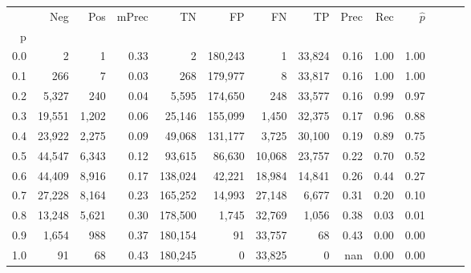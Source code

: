 \begin{tabular}{rrrrrrrrrrrrrr}
\toprule
{} &     Neg &    Pos & mPrec &       TN &       FP &      FN &      TP &  Prec &   Rec & $\hat{p}$ \\
p   &         &        &       &          &          &         &         &       &       &           \\
\midrule
0.0 &       2 &      1 &  0.33 &        2 &  180,243 &       1 &  33,824 &  0.16 &  1.00 &      1.00 \\
0.1 &     266 &      7 &  0.03 &      268 &  179,977 &       8 &  33,817 &  0.16 &  1.00 &      1.00 \\
0.2 &   5,327 &    240 &  0.04 &    5,595 &  174,650 &     248 &  33,577 &  0.16 &  0.99 &      0.97 \\
0.3 &  19,551 &  1,202 &  0.06 &   25,146 &  155,099 &   1,450 &  32,375 &  0.17 &  0.96 &      0.88 \\
0.4 &  23,922 &  2,275 &  0.09 &   49,068 &  131,177 &   3,725 &  30,100 &  0.19 &  0.89 &      0.75 \\
0.5 &  44,547 &  6,343 &  0.12 &   93,615 &   86,630 &  10,068 &  23,757 &  0.22 &  0.70 &      0.52 \\
0.6 &  44,409 &  8,916 &  0.17 &  138,024 &   42,221 &  18,984 &  14,841 &  0.26 &  0.44 &      0.27 \\
0.7 &  27,228 &  8,164 &  0.23 &  165,252 &   14,993 &  27,148 &   6,677 &  0.31 &  0.20 &      0.10 \\
0.8 &  13,248 &  5,621 &  0.30 &  178,500 &    1,745 &  32,769 &   1,056 &  0.38 &  0.03 &      0.01 \\
0.9 &   1,654 &    988 &  0.37 &  180,154 &       91 &  33,757 &      68 &  0.43 &  0.00 &      0.00 \\
1.0 &      91 &     68 &  0.43 &  180,245 &        0 &  33,825 &       0 &   nan &  0.00 &      0.00 \\
\bottomrule
\end{tabular}
